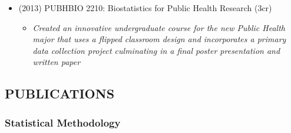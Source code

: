 \documentclass[
  english,
  letterpaper,
  DIV=11,
  numbers=noendperiod]{scrartcl}
\providecommand{\tightlist}{%
  \setlength{\itemsep}{0pt}\setlength{\parskip}{0pt}}
\begin{document}
\begin{itemize}
  \begin{itemize}
  \tightlist
  \item
    \emph{Redesigned the traditional in-person course and converted to
    100\% online delivery mode}
  \end{itemize}
\item
  (2013) PUBHBIO 2210: Biostatistics for Public Health Research (3cr)

  \begin{itemize}
  \tightlist
  \item
    \emph{Created an innovative undergraduate course for the new Public
    Health major that uses a flipped classroom design and incorporates a
    primary data collection project culminating in a final poster
    presentation and written paper}
  \end{itemize}
\end{itemize}

\subsection{PUBLICATIONS}\label{publications}

\subsubsection{Statistical Methodology}\label{statistical-methodology}
\end{document}
